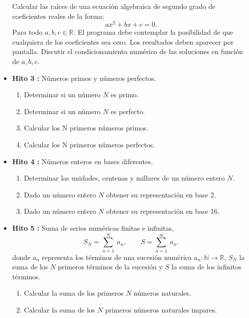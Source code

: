 \documentclass[12pt,spanish]{article}
\begin{document}
\begin{itemize}
Calcular las raíces de una ecuación algebraica de segundo grado
de coeficientes reales de la forma: 
$$
a x^2 + b x + c = 0.
\label{ecuacion_segundo_grado}
$$
Para todo  $a, b, c \in \mathbb{R}$.
El programa debe contemplar la posibilidad de que cualquiera de los coeficientes
sea cero. Los resultados deben aparecer por pantalla. Discutir el 
condicionamiento numérico de las soluciones en función de $a, b, c $. 
 
\vspace{1cm}
\item {\bf Hito 3 :}    Números primos y números perfectos.  
\begin{enumerate} 
\item Determinar si un número $ N $ es primo. 
\item Determinar si un número $ N $ es perfecto. 
\item Calcular los N primeros números primos. 
\item Calcular los N primeros números perfectos. 
\end{enumerate}


\vspace{1cm}
\item {\bf Hito 4 :}  
Números enteros en bases diferentes. 
\begin{enumerate} 
\item Determinar las unidades, centenas y millares de un número entero $ N $. 
\item Dado un número entero $ N $ obtener su representación en base 2. 
\item Dado un número entero $ N $ obtener su representación en base 16. 
\end{enumerate}
 
 
\newpage 
\item {\bf Hito 5 :}   Suma de series numéricas finitas e infinitas,    
$$
   S_N = \sum_{n=1} ^{N} \ a_n, \qquad 
   S =  \sum_{n=1} ^{\infty} \ a_n.
$$ 
donde $ a_n $ representa  los términos de una sucesión numérica $ a_n: \mathbb{N} \rightarrow\mathbb{R}$,
$ S_N $ la suma de los $ N $ primeros términos de la sucesión y $ S $ la suma de los infinitos términos. 
                                                                         
\begin{enumerate}    
	\item Calcular la suma de los primeros $ N $  números naturales.	
	\item Calcular la suma de los $ N $  primeros números naturales impares.
	

\end{enumerate}
\end{itemize}
\end{document}

